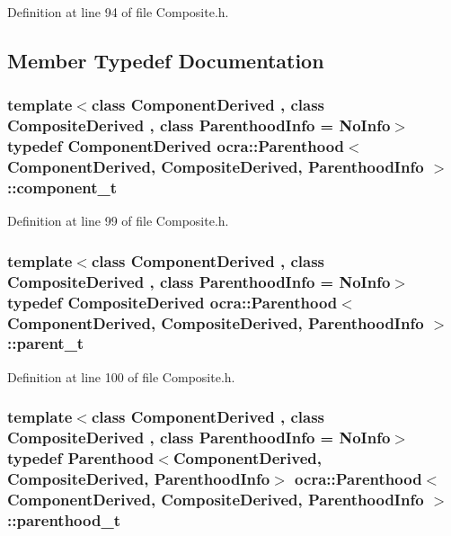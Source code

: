 Definition at line 94 of file Composite.\+h.



\subsection{Member Typedef Documentation}
\subsubsection[{\texorpdfstring{component\+\_\+t}{component_t}}]{\setlength{\rightskip}{0pt plus 5cm}template$<$class Component\+Derived , class Composite\+Derived , class Parenthood\+Info  = No\+Info$>$ typedef Component\+Derived {\bf ocra\+::\+Parenthood}$<$ Component\+Derived, Composite\+Derived, Parenthood\+Info $>$\+::{\bf component\+\_\+t}}\hypertarget{classocra_1_1Parenthood_a44b601577125fe0fd1d1e5ae4f143349}{}\label{classocra_1_1Parenthood_a44b601577125fe0fd1d1e5ae4f143349}


Definition at line 99 of file Composite.\+h.

\subsubsection[{\texorpdfstring{parent\+\_\+t}{parent_t}}]{\setlength{\rightskip}{0pt plus 5cm}template$<$class Component\+Derived , class Composite\+Derived , class Parenthood\+Info  = No\+Info$>$ typedef Composite\+Derived {\bf ocra\+::\+Parenthood}$<$ Component\+Derived, Composite\+Derived, Parenthood\+Info $>$\+::{\bf parent\+\_\+t}}\hypertarget{classocra_1_1Parenthood_a2f95265c57cf96bbc26afee2ac757dd6}{}\label{classocra_1_1Parenthood_a2f95265c57cf96bbc26afee2ac757dd6}


Definition at line 100 of file Composite.\+h.

\subsubsection[{\texorpdfstring{parenthood\+\_\+t}{parenthood_t}}]{\setlength{\rightskip}{0pt plus 5cm}template$<$class Component\+Derived , class Composite\+Derived , class Parenthood\+Info  = No\+Info$>$ typedef {\bf Parenthood}$<$Component\+Derived, Composite\+Derived, Parenthood\+Info$>$ {\bf ocra\+::\+Parenthood}$<$ Component\+Derived, Composite\+Derived, Parenthood\+Info $>$\+::{\bf parenthood\+\_\+t}}\hypertarget{classocra_1_1Parenthood_acdae20cb747190b5dc9dbe42290bde78}{}\label{classocra_1_1Parenthood_acdae20cb747190b5dc9dbe42290bde78}


